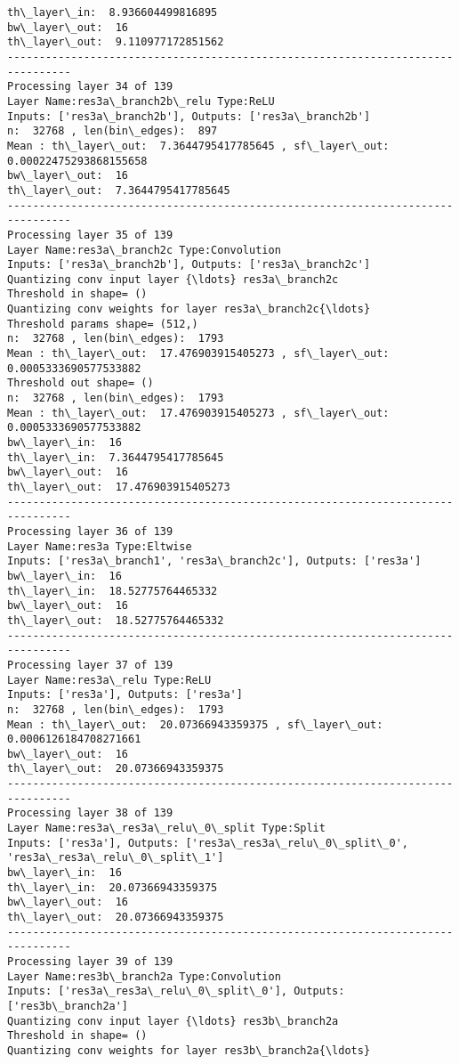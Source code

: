 \documentclass[11pt]{article}
\begin{document}
\begin{Verbatim}[commandchars=\\\{\}]
th\_layer\_in:  8.936604499816895
bw\_layer\_out:  16
th\_layer\_out:  9.110977172851562
--------------------------------------------------------------------------------
Processing layer 34 of 139
Layer Name:res3a\_branch2b\_relu Type:ReLU
Inputs: ['res3a\_branch2b'], Outputs: ['res3a\_branch2b']
n:  32768 , len(bin\_edges):  897
Mean : th\_layer\_out:  7.3644795417785645 , sf\_layer\_out:  0.00022475293868155658
bw\_layer\_out:  16
th\_layer\_out:  7.3644795417785645
--------------------------------------------------------------------------------
Processing layer 35 of 139
Layer Name:res3a\_branch2c Type:Convolution
Inputs: ['res3a\_branch2b'], Outputs: ['res3a\_branch2c']
Quantizing conv input layer {\ldots} res3a\_branch2c
Threshold in shape= ()
Quantizing conv weights for layer res3a\_branch2c{\ldots}
Threshold params shape= (512,)
n:  32768 , len(bin\_edges):  1793
Mean : th\_layer\_out:  17.476903915405273 , sf\_layer\_out:  0.0005333690577533882
Threshold out shape= ()
n:  32768 , len(bin\_edges):  1793
Mean : th\_layer\_out:  17.476903915405273 , sf\_layer\_out:  0.0005333690577533882
bw\_layer\_in:  16
th\_layer\_in:  7.3644795417785645
bw\_layer\_out:  16
th\_layer\_out:  17.476903915405273
--------------------------------------------------------------------------------
Processing layer 36 of 139
Layer Name:res3a Type:Eltwise
Inputs: ['res3a\_branch1', 'res3a\_branch2c'], Outputs: ['res3a']
bw\_layer\_in:  16
th\_layer\_in:  18.52775764465332
bw\_layer\_out:  16
th\_layer\_out:  18.52775764465332
--------------------------------------------------------------------------------
Processing layer 37 of 139
Layer Name:res3a\_relu Type:ReLU
Inputs: ['res3a'], Outputs: ['res3a']
n:  32768 , len(bin\_edges):  1793
Mean : th\_layer\_out:  20.07366943359375 , sf\_layer\_out:  0.0006126184708271661
bw\_layer\_out:  16
th\_layer\_out:  20.07366943359375
--------------------------------------------------------------------------------
Processing layer 38 of 139
Layer Name:res3a\_res3a\_relu\_0\_split Type:Split
Inputs: ['res3a'], Outputs: ['res3a\_res3a\_relu\_0\_split\_0', 'res3a\_res3a\_relu\_0\_split\_1']
bw\_layer\_in:  16
th\_layer\_in:  20.07366943359375
bw\_layer\_out:  16
th\_layer\_out:  20.07366943359375
--------------------------------------------------------------------------------
Processing layer 39 of 139
Layer Name:res3b\_branch2a Type:Convolution
Inputs: ['res3a\_res3a\_relu\_0\_split\_0'], Outputs: ['res3b\_branch2a']
Quantizing conv input layer {\ldots} res3b\_branch2a
Threshold in shape= ()
Quantizing conv weights for layer res3b\_branch2a{\ldots}

\end{Verbatim}
\end{document}
